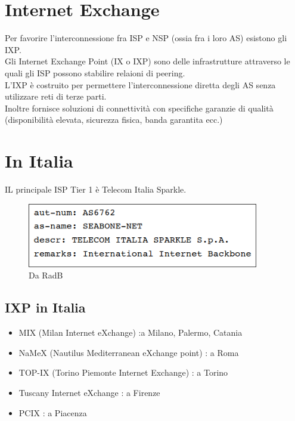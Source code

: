 \documentclass{report}
\begin{document}
        \section{Internet Exchange}
            Per favorire l’interconnessione fra ISP e NSP (ossia fra i loro AS) esistono gli IXP.
            \\
            Gli Internet Exchange Point (IX o IXP) sono delle infrastrutture attraverso le quali gli ISP possono stabilire relaioni di peering.
            \\
            L'IXP è costruito per permettere l'interconnessione diretta degli AS senza utilizzare reti di terze parti.
            \\
            Inoltre fornisce soluzioni di connettività con specifiche garanzie di qualità (disponibilità elevata, sicurezza fisica, banda garantita ecc.)
        \section{In Italia}
            IL principale ISP Tier 1 è Telecom Italia Sparkle.
            \\
            \begin{figure}[H]
                \includegraphics[width=0.9\textwidth]{3/it.png}
                \caption{Da RadB}
            \end{figure} 
            \subsection{IXP in Italia}
                \begin{itemize}
                    \item MIX (Milan Internet eXchange) :a Milano, Palermo, Catania
                    \item NaMeX (Nautilus Mediterranean eXchange point) : a  Roma
                    \item TOP-IX (Torino Piemonte Internet Exchange) : a Torino
                    \item Tuscany Internet eXchange : a Firenze
                    \item PCIX : a Piacenza
                \end{itemize}
\end{document}
